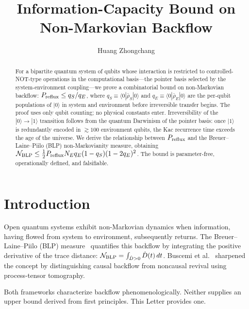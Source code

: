 \documentclass[aps,prl,twocolumn,superscriptaddress,hyperref]{revtex4-2}
\begin{document}
\title{Information-Capacity Bound on Non-Markovian Backflow}

\author{Huang Zhongchang}

\begin{abstract}
For a bipartite quantum system of qubits whose interaction is restricted to controlled-NOT-type operations in the computational basis---the pointer basis selected by the system-environment coupling---we prove a combinatorial bound on non-Markovian backflow: $P_{\rm reflux} \leq q_S/q_E$, where $q_S \equiv \langle 0|\bar{\rho}_S|0\rangle$ and $q_E \equiv \langle 0|\bar{\rho}_E|0\rangle$ are the per-qubit populations of $|0\rangle$ in system and environment before irreversible transfer begins. The proof uses only qubit counting; no physical constants enter. Irreversibility of the $|0\rangle \to |1\rangle$ transition follows from the quantum Darwinism of the pointer basis: once $|1\rangle$ is redundantly encoded in $\gtrsim 100$ environment qubits, the Kac recurrence time exceeds the age of the universe. We derive the relationship between $P_{\rm reflux}$ and the Breuer--Laine--Piilo (BLP) non-Markovianity measure, obtaining $\mathcal{N}_{\rm BLP} \leq \frac{1}{2}P_{\rm reflux} N_E q_E (1-q_S)(1-2q_E)^2$. The bound is parameter-free, operationally defined, and falsifiable.
\end{abstract}

\maketitle

\section{Introduction}

Open quantum systems exhibit non-Markovian dynamics when information, having flowed from system to environment, subsequently returns. The Breuer--Laine--Piilo (BLP) measure~\cite{Breuer:2009} quantifies this backflow by integrating the positive derivative of the trace distance: $\mathcal{N}_{\rm BLP} = \int_{\dot{D}>0} \dot{D}(t)\,dt$. Buscemi et al.~\cite{Buscemi:2025} sharpened the concept by distinguishing causal backflow from noncausal revival using process-tensor tomography.

Both frameworks characterize backflow phenomenologically. Neither supplies an upper bound derived from first principles. This Letter provides one.
\end{document}

